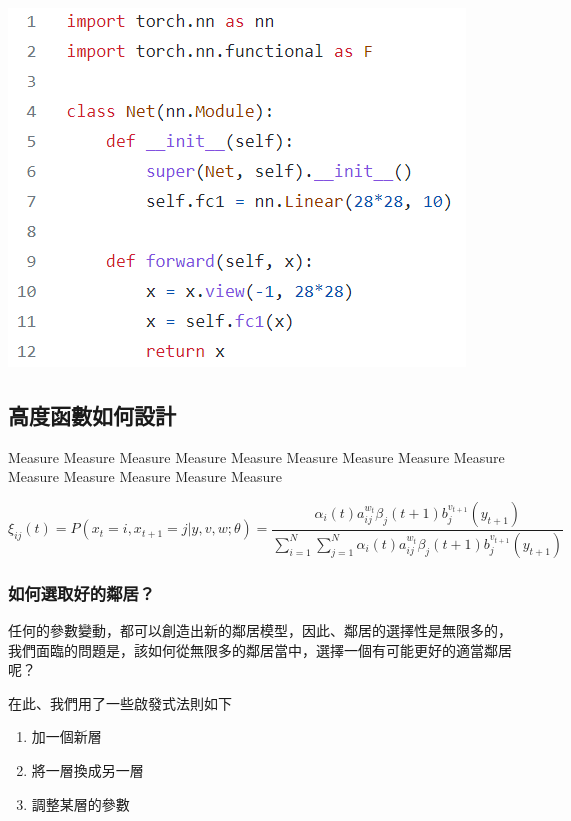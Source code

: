 \documentclass{article}
\begin{document}
\begin{center}
\includegraphics{./img/fc1.png}
\end{center}

\subsection{高度函數如何設計}

Measure Measure Measure Measure Measure Measure Measure Measure Measure Measure Measure Measure Measure Measure 

\begin{equation}
\xi _{ij}(t)=P(x_{t}=i,x_{t+1}=j|y,v,w;\theta)= {\frac {\alpha _{i}(t)a^{w_t}_{ij}\beta _{j}(t+1)b^{v_{t+1}}_{j}(y_{t+1})}{\sum _{i=1}^{N} \sum _{j=1}^{N} \alpha _{i}(t)a^{w_t}_{ij}\beta _{j}(t+1)b^{v_{t+1}}_{j}(y_{t+1})}}
\end{equation}

\subsubsection{如何選取好的鄰居？}

任何的參數變動，都可以創造出新的鄰居模型，因此、鄰居的選擇性是無限多的，我們面臨的問題是，該如何從無限多的鄰居當中，選擇一個有可能更好的適當鄰居呢？

在此、我們用了一些啟發式法則如下

\begin{enumerate}  
\item 加一個新層 
\item 將一層換成另一層
\item 調整某層的參數
\end{enumerate}
\end{document}
